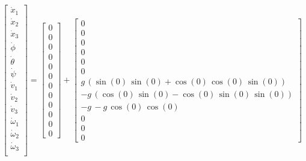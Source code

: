 \documentclass{article}
\begin{document}
\begin{equation}
    \begin{aligned}
        \begin{bmatrix}
            \dot{x}_1 \\ \dot{x}_2 \\ \dot{x}_3 \\
            \dot{\phi} \\ \dot{\theta} \\ \dot{\psi} \\
            \dot{v}_1 \\ \dot{v}_2 \\ \dot{v}_3 \\
            \dot{\omega}_1 \\ \dot{\omega}_2 \\ \dot{\omega}_3 \\
        \end{bmatrix}
        = 
        \begin{bmatrix}
            0 \\ 0 \\ 0 \\ 0 \\ 0 \\ 0 \\ 0 \\ 0 \\ 0 \\ 0 \\ 0 \\ 0
        \end{bmatrix}
        +
        \begin{bmatrix}
            0 \\ 0 \\ 0 \\ 0 \\ 0 \\ 0 \\
            g\,{\left(\sin \left(0 \right)\,\sin \left(0 \right)+\cos \left(0 \right)\,\cos \left(0 \right)\,\sin \left(0 \right)\right)}\\
            -g\,{\left(\cos \left(0 \right)\,\sin \left(0 \right)-\cos \left(0 \right)\,\sin \left(0 \right)\,\sin \left(0 \right)\right)}\\
            -g\,-g\,\cos(0)\,\cos(0) \\
            0 \\ 0 \\ 0
        \end{bmatrix}
    \end{aligned}
\end{equation}
\end{document}
